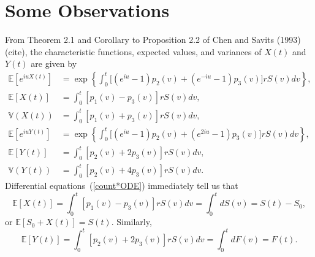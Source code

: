 \documentclass[10pt]{article}
\newcommand{\Var}{\mathbb{V}}
\newcommand{\EE}{\mathbb{E}}
\begin{document}
\section{Some Observations}

From Theorem 2.1 and Corollary to Proposition 2.2 of Chen and Savits (1993) (cite), the characteristic functions, expected values, and variances of $X(t)$ and $Y(t)$ are
given by
\begin{equation}\label{Chen*Savits*formulas}
\begin{split}
\EE[e^{iuX(t)}] &= \exp \left\{ \int_0^t \Big[ \left(e^{iu}-1\right)p_2(v) + \left(e^{-iu} - 1\right)p_3(v) \Big] r S(v) dv\right\},\\
\EE[X(t)] &= \int_0^t [p_1(v) - p_3(v)] r S(v) dv,\\
\Var(X(t)) &= \int_0^t [p_1(v) + p_3(v)] r S(v) dv, \\
\EE[e^{iuY(t)}] &= \exp \left\{ \int_0^t \Big[ \left(e^{iu}-1\right)p_2(v) + \left(e^{2iu} - 1\right)p_3(v) \Big] r S(v) dv\right\},\\
\EE[Y(t)] &= \int_0^t [p_2(v) + 2p_3(v)] r S(v) dv,\\
\Var(Y(t)) &= \int_0^t [p_2(v) + 4p_3(v)] r S(v) dv.
\end{split}
\end{equation}
Differential equations~(\ref{count*ODE}) immediately tell us that 
\begin{equation*}
\EE[X(t)] = \int_0^t [p_1(v) - p_3(v)]   r  S(v) dv=\int_0^t dS(v)=S(t)-S_0,
\end{equation*}
or $\EE[S_0+X(t)] = S(t)$. 
Similarly,
\begin{equation*}
\EE[Y(t)] = \int_0^t [p_2(v) + 2p_3(v)] r S(v) dv=\int_0^t dF(v)=F(t).
\end{equation*}
\end{document}
